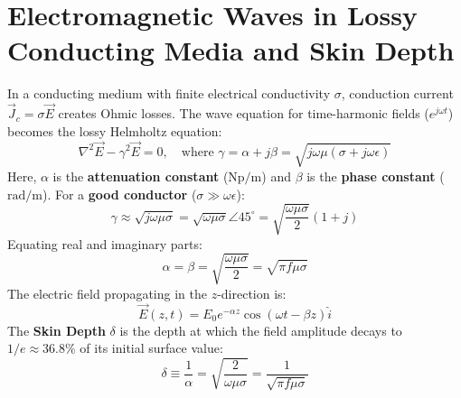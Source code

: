 \section{Electromagnetic Waves in Lossy Conducting Media and Skin Depth}
In a conducting medium with finite electrical conductivity $\sigma$, conduction current $\vec{J}_c = \sigma \vec{E}$ creates Ohmic losses. The wave equation for time-harmonic fields ($e^{j\omega t}$) becomes the lossy Helmholtz equation:
\begin{equation}
\nabla^2 \vec{E} - \gamma^2 \vec{E} = 0, \quad \text{where } \gamma = \alpha + j\beta = \sqrt{j\omega\mu(\sigma + j\omega\epsilon)}
\end{equation}
Here, $\alpha$ is the \textbf{attenuation constant} ($\text{Np/m}$) and $\beta$ is the \textbf{phase constant} ($\text{rad/m}$).
For a \textbf{good conductor} ($\sigma \gg \omega\epsilon$):
\begin{equation}
\gamma \approx \sqrt{j\omega\mu\sigma} = \sqrt{\omega\mu\sigma}\angle 45^\circ = \sqrt{\frac{\omega\mu\sigma}{2}}(1 + j)
\end{equation}
Equating real and imaginary parts:
\begin{equation}
\alpha = \beta = \sqrt{\frac{\omega\mu\sigma}{2}} = \sqrt{\pi f \mu \sigma}
\end{equation}
The electric field propagating in the $z$-direction is:
\begin{equation}
\vec{E}(z,t) = E_0 e^{-\alpha z} \cos(\omega t - \beta z)\hat{i}
\end{equation}
The \textbf{Skin Depth} $\delta$ is the depth at which the field amplitude decays to $1/e \approx 36.8\%$ of its initial surface value:
\begin{equation}
\delta \equiv \frac{1}{\alpha} = \sqrt{\frac{2}{\omega\mu\sigma}} = \frac{1}{\sqrt{\pi f \mu \sigma}}
\end{equation}


